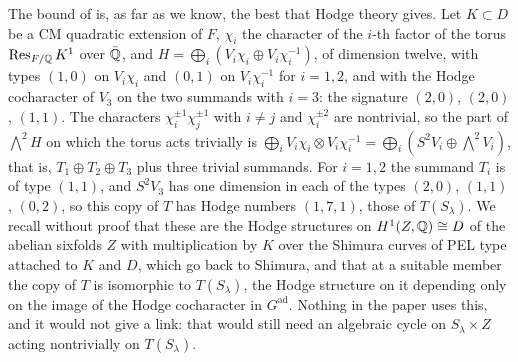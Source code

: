 \begin{remark}
\label{rem:mumfordunitary}
The bound of  is, as far as we know, the best that
Hodge theory gives. Let $K\subset D$ be a CM quadratic extension of $F$,
$\chi_{i}$ the character of the $i$-th factor of the torus
$\operatorname{Res}_{F/\mathbb{Q}}K^{1}$ over $\bar{\mathbb{Q}}$, and
$H=\bigoplus_{i}(V_{i}\chi_{i}\oplus V_{i}\chi_{i}^{-1})$, of dimension twelve,
with types $(1,0)$ on $V_{i}\chi_{i}$ and $(0,1)$ on $V_{i}\chi_{i}^{-1}$ for
$i=1,2$, and with the Hodge cocharacter of $V_{3}$ on the two summands with
$i=3$: the signature $(2,0)$, $(2,0)$, $(1,1)$. The characters
$\chi_{i}^{\pm1}\chi_{j}^{\pm1}$ with $i\ne j$ and $\chi_{i}^{\pm2}$ are
nontrivial, so the part of $\bigwedge^{2}H$ on which the torus acts trivially
is $\bigoplus_{i}V_{i}\chi_{i}\otimes V_{i}\chi_{i}^{-1}=\bigoplus_{i}
(S^{2}V_{i}\oplus\bigwedge^{2}V_{i})$, that is, $T_{1}\oplus T_{2}\oplus T_{3}$
plus three trivial summands. For $i=1,2$ the summand $T_{i}$ is of type
$(1,1)$, and $S^{2}V_{3}$ has one dimension in each of the types $(2,0)$,
$(1,1)$, $(0,2)$, so this copy of $T$ has Hodge numbers $(1,7,1)$, those of
$T(S_{\lambda})$. We recall
without proof that these are the Hodge structures on $H^{1}(Z,\mathbb{Q})\cong D$ of
the abelian sixfolds $Z$ with multiplication by $K$ over the Shimura curves of
PEL type attached to $K$ and $D$, which go back to Shimura, and that at a
suitable member the copy of $T$ is isomorphic to $T(S_{\lambda})$, the Hodge
structure on it depending only on the image of the Hodge cocharacter in
$G^{\mathrm{ad}}$. Nothing in the paper uses this, and it would not give a
link: that would still need an algebraic cycle on $S_{\lambda}\times Z$ acting
nontrivially on $T(S_{\lambda})$.
\end{remark}

